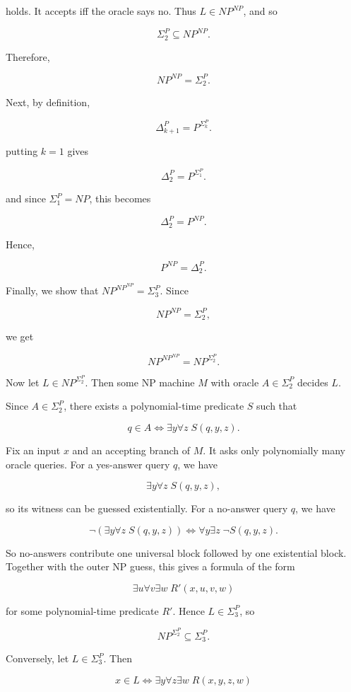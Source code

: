 \documentclass[11pt]{article}
\begin{document}
holds. It accepts iff the oracle says no. Thus $L \in NP^{NP}$, and so

\[
\Sigma_2^P \subseteq NP^{NP}.
\]

Therefore,

\[
NP^{NP} = \Sigma_2^P.
\]

Next, by definition,

\[
\Delta_{k+1}^P = P^{\Sigma_k^P}.
\]

putting $k = 1$ gives

\[
\Delta_2^P = P^{\Sigma_1^P}.
\]

and since $\Sigma_1^P = NP$, this becomes

\[
\Delta_2^P = P^{NP}.
\]

Hence,

\[
P^{NP} = \Delta_2^P.
\]

Finally, we show that $NP^{NP^{NP}} = \Sigma_3^P$. Since

\[
NP^{NP} = \Sigma_2^P,
\]

we get

\[
NP^{NP^{NP}} = NP^{\Sigma_2^P}.
\]

Now let $L \in NP^{\Sigma_2^P}$. Then some NP machine $M$ with oracle $A \in \Sigma_2^P$ decides $L$.

Since $A \in \Sigma_2^P$, there exists a polynomial-time predicate $S$ such that

\[
q \in A \iff \exists y \forall z \; S(q,y,z).
\]

Fix an input $x$ and an accepting branch of $M$. It asks only polynomially many oracle queries. For a yes-answer query $q$, we have

\[
\exists y \forall z \; S(q,y,z),
\]

so its witness can be guessed existentially. For a no-answer query $q$, we have

\[
\neg(\exists y \forall z \; S(q,y,z)) \iff \forall y \exists z \; \neg S(q,y,z).
\]

So no-answers contribute one universal block followed by one existential block. Together with the outer NP guess, this gives a formula of the form

\[
\exists u \forall v \exists w \; R'(x,u,v,w)
\]

for some polynomial-time predicate $R'$. Hence $L \in \Sigma_3^P$, so

\[
NP^{\Sigma_2^P} \subseteq \Sigma_3^P.
\]

Conversely, let $L \in \Sigma_3^P$. Then

\[
x \in L \iff \exists y \forall z \exists w \; R(x,y,z,w)
\]
\end{document}
